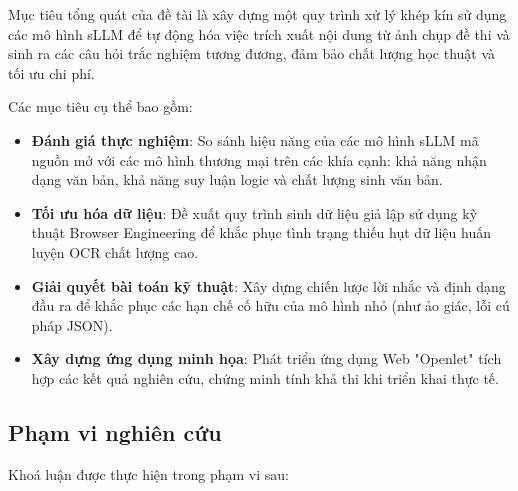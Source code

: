 Mục tiêu tổng quát của đề tài là xây dựng một quy trình xử lý khép kín sử dụng
các mô hình sLLM để tự động hóa việc trích xuất nội dung từ ảnh chụp đề thi và
sinh ra các câu hỏi trắc nghiệm tương đương, đảm bảo chất lượng học thuật và tối
ưu chi phí.

Các mục tiêu cụ thể bao gồm:

\begin{itemize}

 \item \textbf{Đánh giá thực nghiệm}: So sánh hiệu năng của các mô hình sLLM mã nguồn
mở với các mô hình thương mại trên các khía cạnh: khả năng nhận dạng văn bản, khả
năng suy luận logic và chất lượng sinh văn bản.

\item \textbf{Tối ưu hóa dữ liệu}: Đề xuất quy trình sinh dữ liệu giả lập sử dụng kỹ
thuật Browser Engineering để khắc phục tình trạng thiếu hụt dữ liệu huấn luyện OCR
chất lượng cao.

\item \textbf{Giải quyết bài toán kỹ thuật}: Xây dựng chiến lược lời nhắc và định dạng
đầu ra để khắc phục các hạn chế cố hữu của mô hình nhỏ (như ảo giác, lỗi cú pháp
JSON).

\item \textbf{Xây dựng ứng dụng minh họa}: Phát triển ứng dụng Web "Openlet" tích
hợp các kết quả nghiên cứu, chứng minh tính khả thi khi triển khai thực tế.
\end{itemize}

\subsection{Phạm vi nghiên cứu}

Khoá luận được thực hiện trong phạm vi sau:

